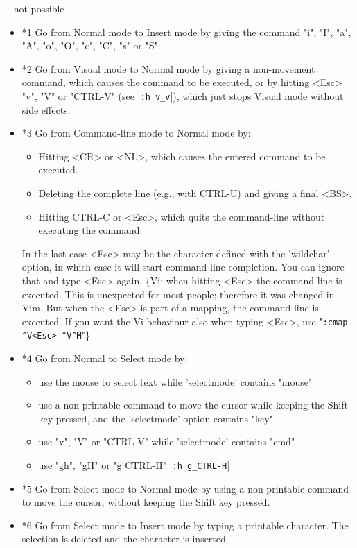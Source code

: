 -- not possible

\begin{itemize}
				\item *1 Go from Normal mode to Insert mode by giving the command "i", "I", "a", "A", "o", "O", "c", "C", "s" or "S".
				\item *2 Go from Visual mode to Normal mode by giving a non-movement command, which causes the command to be executed, or by hitting <Esc> "v", "V" or "CTRL-V" (see |\verb!:h v_v!|), which just stops Visual mode without side effects.
				\item *3 Go from Command-line mode to Normal mode by:
								\begin{itemize}
												\item Hitting <CR> or <NL>, which causes the entered command to be executed.
												\item Deleting the complete line (e.g., with CTRL-U) and giving a final <BS>.
												\item Hitting CTRL-C or <Esc>, which quits the command-line without executing
																the command.
								\end{itemize}
								In the last case <Esc> may be the character defined with the 'wildchar' option, in which case it will start command-line completion.
								You can ignore that and type <Esc> again.
								\{Vi: when hitting <Esc> the command-line is executed.
								This is unexpected for most people; therefore it was changed in Vim.
								But when the <Esc> is part of a mapping, the command-line is executed.
								If you want the Vi behaviour also when typing <Esc>, use "\verb!:cmap ^V<Esc> ^V^M!"\}
				\item *4 Go from Normal to Select mode by:
								\begin{itemize}
												\item use the mouse to select text while 'selectmode' contains "mouse"
												\item use a non-printable command to move the cursor while keeping the Shift key pressed, and the 'selectmode' option contains "key"
												\item use "v", "V" or "CTRL-V" while 'selectmode' contains "cmd"
												\item use "gh", "gH" or "g CTRL-H"  |\verb!:h g_CTRL-H!|
								\end{itemize}
				\item *5 Go from Select mode to Normal mode by using a non-printable command to move the cursor, without keeping the Shift key pressed.
				\item *6 Go from Select mode to Insert mode by typing a printable character.
								The selection is deleted and the character is inserted.
\end{itemize}

